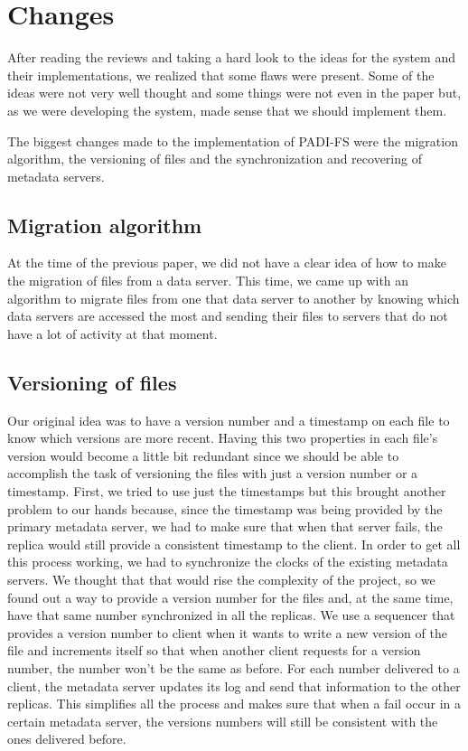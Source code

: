 \section{Changes}

After reading the reviews and taking a hard look to the ideas for the system and
their implementations, we realized that some flaws were present. Some of the
ideas were not very well thought and some things were not even in the paper
but, as we were developing the system, made sense that we should implement
them.

The biggest changes made to the implementation of PADI-FS were the migration
algorithm, the versioning of files and the synchronization and recovering of
metadata servers.

\subsection{Migration algorithm}

At the time of the previous paper, we did not have a clear idea of how to make
the migration of files from a data server. This time, we came up with an algorithm
to migrate files from one that data server to another by knowing which data servers
are accessed the most and sending their files to servers that do not have a lot of
activity at that moment.

\subsection{Versioning of files}

Our original idea was to have a version number and a timestamp on each file to know
which versions are more recent. Having this two properties in each file's version would
become a little bit redundant since we should be able to accomplish the task of
versioning the files with just a version number or a timestamp. First, we tried to use
just the timestamps but this brought another problem to our hands because, since the
timestamp was being provided by the primary metadata server, we had to make sure that
when that server fails, the replica would still provide a consistent timestamp to the client.
In order to get all this process working, we had to synchronize the clocks of the existing
metadata servers. We thought that that would rise the complexity of the project, so we found
out a way to provide a version number for the files and, at the same time, have that same
number synchronized in all the replicas. We use a sequencer that provides a version number
to client when it wants to write a new version of the file and increments itself so that when
another client requests for a version number, the number won't be the same as before.
For each number delivered to a client, the metadata server updates its log and send that
information to the other replicas. This simplifies all the process and makes sure that when
a fail occur in a certain metadata server, the versions numbers will still be consistent with
the ones delivered before.

